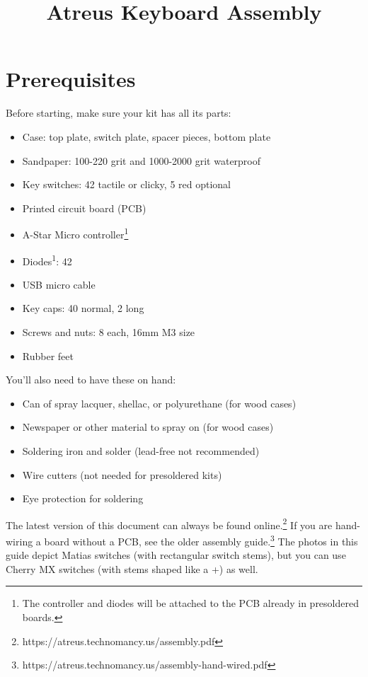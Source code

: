\documentclass[landscape,twocolumn]{article}
\title{Atreus Keyboard Assembly}
\date{ }
\begin{document}
\setlength{\columnsep}{1.4cm}
\setlength{\parindent}{0cm}
\maketitle
\section{Prerequisites}

Before starting, make sure your kit has all its parts:

\begin{itemize}
\item Case: top plate, switch plate, spacer pieces, bottom plate
\item Sandpaper: 100-220 grit and 1000-2000 grit waterproof
\item Key switches: 42 tactile or clicky, 5 red optional
\item Printed circuit board (PCB)
\item A-Star Micro controller\footnote{The controller and diodes will be
  attached to the PCB already in presoldered boards.}
\item Diodes\textsuperscript{1}: 42
\item USB micro cable
\item Key caps: 40 normal, 2 long
\item Screws and nuts: 8 each, 16mm M3 size
\item Rubber feet
\end{itemize}

You'll also need to have these on hand:

\begin{itemize}
\item Can of spray lacquer, shellac, or polyurethane (for wood cases)
\item Newspaper or other material to spray on (for wood cases)
\item Soldering iron and solder (lead-free not recommended)
\item Wire cutters (not needed for presoldered kits)
\item Eye protection for soldering
\end{itemize}

\vspace{1em}

The latest version of this document can always be found
online.\footnote{https://atreus.technomancy.us/assembly.pdf} If you are
hand-wiring a board without a PCB, see the older assembly
guide.\footnote{https://atreus.technomancy.us/assembly-hand-wired.pdf}
The photos in this guide depict Matias switches (with rectangular
switch stems), but you can use Cherry MX switches (with stems shaped
like a +) as well.
\end{document}
